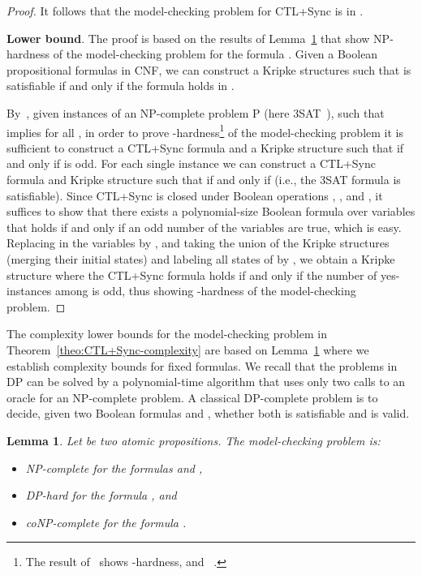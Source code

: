 \documentclass{article}
\newtheorem{lemma}[theorem]{Lemma}
\begin{document}
\begin{proof}
It follows that the model-checking problem for CTL+Sync is in .

{\bf Lower bound}.
The proof is based on the results of Lemma~\ref{lem:CTL+Sync-lower-bounds} 
that show NP-hardness of the model-checking problem for the formula .
Given a Boolean propositional formulas  in CNF, we can construct 
a Kripke structures  such that  is satisfiable if and only if the formula 
 holds in . 

By~\cite[Theorem~5.2]{Wagner87}, given  instances  of an NP-complete problem P (here 3SAT~\cite{Cook71}),
such that  implies  for all , in order to 
prove -hardness\footnote{The result of~\cite[Theorem~5.2]{Wagner87} 
shows -hardness, 
and ~\cite[Theorem~1]{BH91}.}  of the model-checking problem 
it is sufficient to construct a CTL+Sync formula  and a Kripke structure  such that 
 if and only if  is odd.
For each single instance  we can construct a CTL+Sync formula  
and Kripke structure  such that  if and only if  (i.e.,
the 3SAT formula  is satisfiable). Since CTL+Sync is closed under Boolean
operations , , and , it suffices to show that there exists
a polynomial-size Boolean formula  over variables  that holds if and only if
an odd number of the variables  are true, which is easy. 
Replacing in  the variables  by , and taking the union of 
the Kripke structures  (merging their initial states) and labeling all 
states of  by , we obtain a Kripke structure where  
the CTL+Sync formula  holds if and only if the number of yes-instances
among  is odd, thus showing -hardness of 
the model-checking problem.
\end{proof}

The complexity lower bounds for the model-checking problem in Theorem~\ref{theo:CTL+Sync-complexity}
are based on Lemma~\ref{lem:CTL+Sync-lower-bounds} where we establish complexity bounds for fixed formulas.
We recall that the problems in DP can be solved by a polynomial-time algorithm 
that uses only two calls to an oracle for an NP-complete problem. 
A classical DP-complete problem is to decide, given two Boolean formulas  
and , whether both  is satisfiable and  is valid.

\begin{lemma}\label{lem:CTL+Sync-lower-bounds}
Let  be two atomic propositions. The model-checking problem is:
\begin{itemize}
\item NP-complete for the formulas  and , 
\item DP-hard for the formula , and      \item coNP-complete for the formula .
\end{itemize}
\end{lemma}
\end{document}
